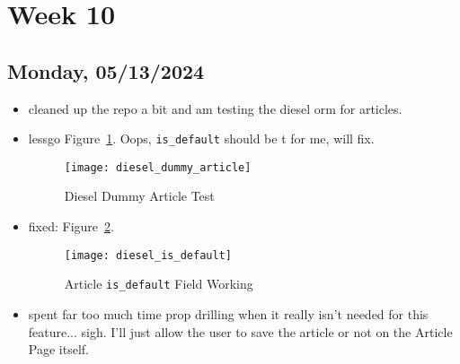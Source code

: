 \newpage
\section{Week 10}
\subsection*{Monday, 05/13/2024}
\begin{itemize}
    \item cleaned up the repo a bit and am testing the diesel orm for articles.
    \item lessgo Figure~\ref{fig:diesel_dummy_article}. Oops, 
        \texttt{is_default} should be t for me, will fix.
        \begin{figure}[ht]
            \centering
            \texttt{[image: diesel\_dummy\_article]}
            \captionsetup{labelfont=bf, textfont=it}
            \caption{Diesel Dummy Article Test}
            \label{fig:diesel_dummy_article}
        \end{figure}
    \item fixed: Figure~\ref{fig:diesel_is_default}.
        \begin{figure}[ht]
            \centering
            \texttt{[image: diesel\_is\_default]}
            \captionsetup{labelfont=bf, textfont=it}
            \caption{Article \texttt{is_default} Field Working}
            \label{fig:diesel_is_default}
        \end{figure}
    \item spent far too much time prop drilling when it really isn't needed for
        this feature... sigh. I'll just allow the user to save the article or
        not on the Article Page itself.
\end{itemize}
